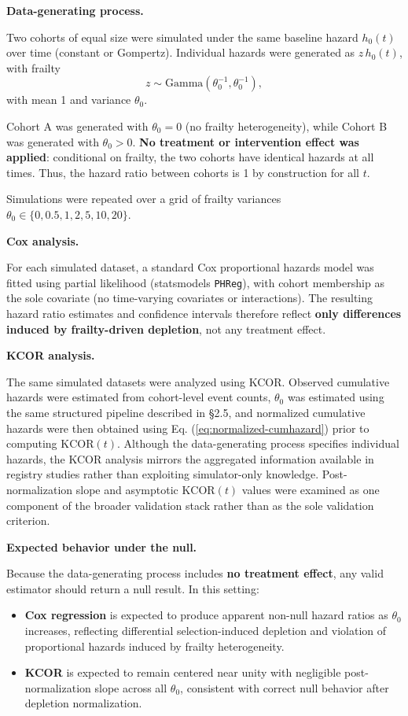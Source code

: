 \documentclass[
]{article}
\providecommand{\tightlist}{%
  \setlength{\itemsep}{0pt}\setlength{\parskip}{0pt}}
\begin{document}
\textbf{Data-generating process.}

Two cohorts of equal size were simulated under the same baseline hazard
\(h_0(t)\) over time (constant or Gompertz). Individual hazards were
generated as \(z\,h_0(t)\), with frailty \[
z \sim \text{Gamma}(\theta_0^{-1}, \theta_0^{-1}),
\] with mean 1 and variance \(\theta_0\).

Cohort A was generated with \(\theta_0 = 0\) (no frailty heterogeneity),
while Cohort B was generated with \(\theta_0 > 0\). \textbf{No treatment
or intervention effect was applied}: conditional on frailty, the two
cohorts have identical hazards at all times. Thus, the hazard ratio
between cohorts is 1 by construction for all \(t\).

Simulations were repeated over a grid of frailty variances
\(\theta_0 \in \{0, 0.5, 1, 2, 5, 10, 20\}\).

\textbf{Cox analysis.}

For each simulated dataset, a standard Cox proportional hazards model
was fitted using partial likelihood (statsmodels \texttt{PHReg}), with
cohort membership as the sole covariate (no time-varying covariates or
interactions). The resulting hazard ratio estimates and confidence
intervals therefore reflect \textbf{only differences induced by
frailty-driven depletion}, not any treatment effect.

\textbf{KCOR analysis.}

The same simulated datasets were analyzed using KCOR. Observed
cumulative hazards were estimated from cohort-level event counts,
\(\theta_0\) was estimated using the same structured pipeline described
in §2.5, and normalized cumulative hazards were then obtained using Eq.
(\ref{eq:normalized-cumhazard}) prior to computing \(\mathrm{KCOR}(t)\).
Although the data-generating process specifies individual hazards, the
KCOR analysis mirrors the aggregated information available in registry
studies rather than exploiting simulator-only knowledge.
Post-normalization slope and asymptotic \(\mathrm{KCOR}(t)\) values were
examined as one component of the broader validation stack rather than as
the sole validation criterion.

\textbf{Expected behavior under the null.}

Because the data-generating process includes \textbf{no treatment
effect}, any valid estimator should return a null result. In this
setting:

\begin{itemize}
\tightlist
\item
  \textbf{Cox regression} is expected to produce apparent non-null
  hazard ratios as \(\theta_0\) increases, reflecting differential
  selection-induced depletion and violation of proportional hazards
  induced by frailty heterogeneity.
\item
  \textbf{KCOR} is expected to remain centered near unity with
  negligible post-normalization slope across all \(\theta_0\),
  consistent with correct null behavior after depletion normalization.
\end{itemize}
\end{document}
